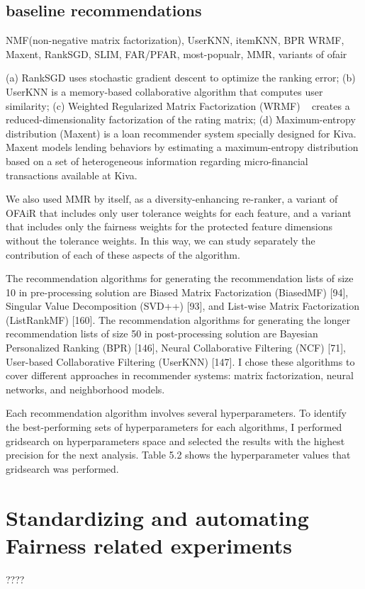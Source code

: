     
    
    
    \subsection{baseline recommendations}
        NMF(non-negative matrix factorization), UserKNN, itemKNN, BPR WRMF, Maxent, RankSGD, SLIM, FAR/PFAR, most-popualr, MMR, variants of ofair
        
        (a) RankSGD \cite{pmlr-v18-jahrer12b} uses stochastic gradient descent to optimize the ranking error; (b) UserKNN \cite{resnick1997recommender}  is a memory-based collaborative algorithm that computes user similarity; (c) Weighted Regularized Matrix Factorization (WRMF) ~\cite{hu2008collaborative} creates a reduced-dimensionality factorization of the rating matrix; (d) Maximum-entropy distribution (Maxent) \cite{choo2014gather} is a loan recommender system specially designed for Kiva. Maxent models lending behaviors by estimating a maximum-entropy distribution based on a set of heterogeneous information regarding micro-financial transactions available at Kiva.
        
        
        We also used MMR by itself, as a diversity-enhancing re-ranker, a variant of OFAiR that includes only user tolerance weights for each feature, and a variant that includes only the fairness weights for the protected feature dimensions without the tolerance weights. In this way, we can study separately the contribution of each of these aspects of the algorithm.
        
        
        The recommendation algorithms for generating the recommendation lists of size 10 in pre-processing solution are Biased Matrix Factorization (BiasedMF) [94], Singular Value Decomposition (SVD++) [93], and List-wise Matrix Factorization (ListRankMF) [160]. The recommendation algorithms for generating the longer recommendation lists of size 50 in post-processing solution are Bayesian Personalized Ranking (BPR) [146], Neural Collaborative Filtering (NCF) [71], User-based Collaborative Filtering (UserKNN) [147]. I chose these algorithms to cover different approaches in recommender systems: matrix factorization, neural networks, and neighborhood models.
        
        Each recommendation algorithm involves several hyperparameters. To identify the best-performing sets of hyperparameters for each algorithms, I performed gridsearch on hyperparameters space and selected the results with the highest precision for the next analysis. Table 5.2 shows the hyperparameter values that gridsearch was performed.
        
\section{Standardizing and automating Fairness related experiments}
????
